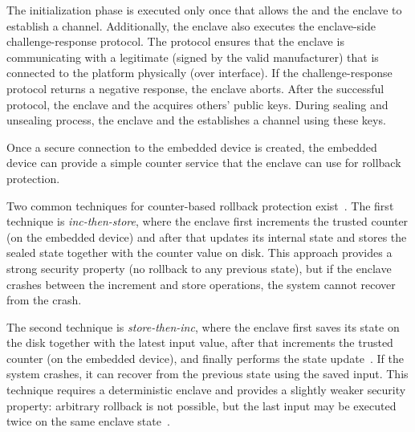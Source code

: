 

 The initialization phase is executed only once that allows the \device and the enclave to establish a \tls channel. Additionally, the enclave also executes the enclave-side challenge-response protocol. The protocol ensures that the enclave is communicating with a legitimate \device (signed by the valid manufacturer) that is connected to the platform physically (over \usb interface). If the challenge-response protocol returns a negative response, the enclave aborts. After the successful \name protocol, the enclave and the \device acquires others' public keys. During sealing and unsealing process, the enclave and the \device establishes a \tls channel using these keys. 

 Once a secure connection to the embedded device is created, the embedded device can provide a simple counter service that the enclave can use for rollback protection. 

Two common techniques for counter-based rollback protection exist~\cite{matetic2017rote}. The first technique is \emph{inc-then-store}, where the enclave first increments the trusted counter (on the embedded device) and after that updates its internal state and stores the sealed state together with the counter value on disk. This approach provides a strong security property (no rollback to any previous state), but if the enclave crashes between the increment and store operations, the system cannot recover from the crash.

The second technique is \emph{store-then-inc}, where the enclave first saves its state on the disk together with the latest input value, after that increments the trusted counter (on the embedded device), and finally performs the state update~\cite{ice, memoir}. If the system crashes, it can recover from the previous state using the saved input. This technique requires a deterministic enclave and provides a slightly weaker security property: arbitrary rollback is not possible, but the last input may be executed twice on the same enclave state~\cite{memoir}.


